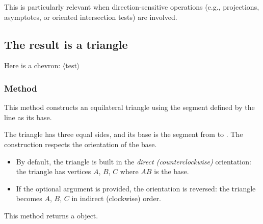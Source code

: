 \medskip
\noindent
This is particularly relevant when direction-sensitive operations (e.g., projections, asymptotes, or oriented intersection tests) are involved.

\vspace{1em}
\begin{tkzexample}[latex=7cm]
\end{tkzexample}


\subsection{The result is a triangle} %

Here is a chevron: $\langle$test$\rangle$

\subsubsection{Method } %
\label{ssub:method_line_equilateral}

This method constructs an equilateral triangle using the segment defined by the line as its base.

\medskip
\noindent
The triangle has three equal sides, and its base is the segment from  to . The construction respects the orientation of the base.

\begin{itemize}
  \item By default, the triangle is built in the \emph{direct (counterclockwise)} orientation: the triangle has vertices $A$, $B$, $C$ where $AB$ is the base.
  \item If the optional argument  is provided, the orientation is reversed: the triangle becomes $A$, $B$, $C$ in indirect (clockwise) order.
\end{itemize}

\medskip
\noindent
This method returns a  object.


